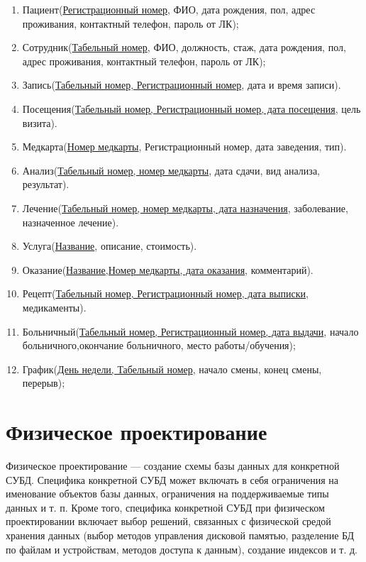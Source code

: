 \documentclass[14pt,a4paper,russian]{extreport}
\begin{document}
\begin{enumerate}[noitemsep]
            \item Пациент(\underline{Регистрационный номер}, ФИО, дата рождения, пол, адрес
                проживания, контактный телефон, пароль от ЛК);
            \item Сотрудник(\underline{Табельный номер}, ФИО, должность, стаж, дата рождения, пол, адрес
                проживания, контактный телефон, пароль от ЛК);
            \item Запись(\underline{Табельный номер, Регистрационный номер}, дата и время записи).
            \item Посещения(\underline{Табельный номер, Регистрационный номер, дата посещения},
                цель визита).
            \item Медкарта(\underline{Номер медкарты}, Регистрационный номер, дата заведения, тип).
            \item Анализ(\underline{Табельный номер, номер медкарты}, дата сдачи, вид анализа,
                результат).
            \item Лечение(\underline{Табельный номер, номер медкарты, дата назначения},
                заболевание, назначенное лечение).
            \item Услуга(\underline{Название}, описание, стоимость).
            \item Оказание(\underline{Название,Номер медкарты, дата оказания}, комментарий).
            \item Рецепт(\underline{Табельный номер, Регистрационный номер, дата выписки}, медикаменты).
            \item Больничный(\underline{Табельный номер, Регистрационный номер, дата выдачи},
                начало больничного,окончание больничного, место работы/обучения);
            \item График(\underline{День недели, Табельный номер}, начало смены, конец смены,
                перерыв);
\end{enumerate}



\chapter{Физическое проектирование}
Физическое проектирование — создание схемы базы данных для конкретной СУБД. Специфика конкретной
СУБД может включать в себя ограничения на именование объектов базы данных, ограничения на
поддерживаемые типы данных и т. п. Кроме того, специфика конкретной СУБД при физическом
проектировании включает выбор решений, связанных с физической средой хранения данных (выбор методов
управления дисковой памятью, разделение БД по файлам и устройствам, методов доступа к данным),
создание индексов и т. д.\cite{dbdesign} 
\end{document}
